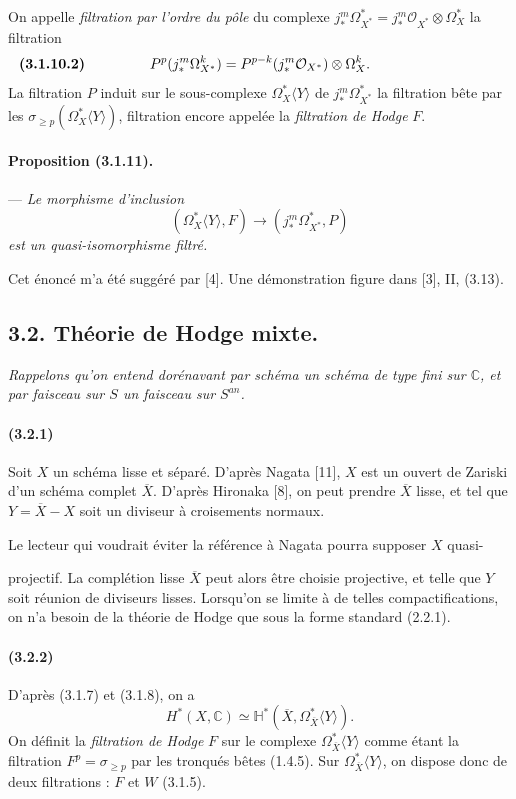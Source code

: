 \documentclass[10pt]{article}
\newcommand{\C}{\mathbb C}
\providecommand{\cO}{\mathcal O}
\providecommand{\cO}{\mathcal O}
\begin{document}
On appelle \emph{filtration par l'ordre du pôle} du complexe $j_*^m\Omega_{X^*}^*=j_*^m\cO_{X^*}\otimes\Omega_X^*$ la filtration
\[
\makebox[\textwidth][s]{\textbf{(3.1.10.2)}\hfill$\displaystyle P^p(j_*^m\Omega_{X^*}^k)=P^{p-k}(j_*^m\cO_{X^*})\otimes\Omega_X^k.$\hfill\phantom{\textbf{(3.1.10.2)}}}
\]
La filtration $P$ induit sur le sous-complexe $\Omega_X^*\langle Y\rangle$ de $j_*^m\Omega_{X^*}^*$ la filtration bête par les $\sigma_{\ge p}(\Omega_X^*\langle Y\rangle)$, filtration encore appelée la \emph{filtration de Hodge} $F$.

\paragraph{Proposition (3.1.11).} --- {\itshape Le morphisme d'inclusion
\[
(\Omega_X^*\langle Y\rangle,F)\longrightarrow(j_*^m\Omega_{X^*}^*,P)
\]
est un quasi-isomorphisme filtré.}

Cet énoncé m'a été suggéré par [4]. Une démonstration figure dans [3], II, (3.13).

\subsection*{3.2. Théorie de Hodge mixte.}

\emph{Rappelons qu'on entend dorénavant par schéma un schéma de type fini sur $\C$, et par faisceau sur $S$ un faisceau sur $S^{an}$.}

\paragraph{(3.2.1)} Soit $X$ un schéma lisse et séparé. D'après Nagata [11], $X$ est un ouvert de Zariski d'un schéma complet $\overline X$. D'après Hironaka [8], on peut prendre $\overline X$ lisse, et tel que $Y=\overline X-X$ soit un diviseur à croisements normaux.

Le lecteur qui voudrait éviter la référence à Nagata pourra supposer $X$ quasi-



projectif. La complétion lisse $\overline X$ peut alors être choisie projective, et telle que $Y$ soit réunion de diviseurs lisses. Lorsqu'on se limite à de telles compactifications, on n'a besoin de la théorie de Hodge que sous la forme standard (2.2.1).

\paragraph{(3.2.2)} D'après (3.1.7) et (3.1.8), on a
\[
H^*(X,\C)\simeq \mathbb H^*(\overline X,\Omega_{\overline X}^{*}\langle Y\rangle).
\]
On définit la \emph{filtration de Hodge} $F$ sur le complexe $\Omega_{\overline X}^{*}\langle Y\rangle$ comme étant la filtration $F^p=\sigma_{\ge p}$ par les tronqués bêtes (1.4.5). Sur $\Omega_{\overline X}^{*}\langle Y\rangle$, on dispose donc de deux filtrations : $F$ et $W$ (3.1.5).
\end{document}
